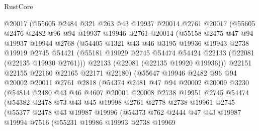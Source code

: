 \begin{lexlean}{RustCore}
\begin{coremodule}
          @20017
          (@55605
            @2484
            @321
            @263
            @43
            @19937
            @20014
            @2761
            @20017
            (@55605
              @2476
              @2482
              @96
              @94
              @19937
              @19946
              @2761
              @20014
              (@55158
                @2475
                @47
                @94
                @19937
                @19944
                @2768
                (@54405
                  @1321
                  @43
                  @46
                  @3195
                  @19936
                  @19943
                  @2738
                  @19919
                  @2745
                  @54421
                  (@55181 @19929 @2745 @54474 @54424 @22133 (@22081 (@22135 @19930 @2761)))
                  @22133
                  (@22081 (@22135 @19920 @19936)))
                @22151
                @22155
                @22160
                @22165
                @22171
                @22180)
              (@55647
                @19946
                @2482
                @96
                @94
                @20002
                @20011
                @2761
                @2818
                (@54374
                  @2481
                  @47
                  @94
                  @20002
                  @20009
                  @3230
                  (@54814
                    @2480
                    @43
                    @46
                    @4607
                    @20001
                    @20008
                    @2738
                    @19951
                    @2745
                    @54474
                    (@54382
                      @2478
                      @73
                      @43
                      @45
                      @19998
                      @2761
                      @2778
                      @2738
                      @19961
                      @2745
                      (@55377
                        @2478
                        @43
                        @19987
                        @19996
                        (@54373
                          @762
                          @2444
                          @47
                          @43
                          @19987
                          @19994
                          @7516
                          (@55231
                            @19986
                            @19993
                            @2738
                            @19969

\end{coremodule}
\end{lexlean}

